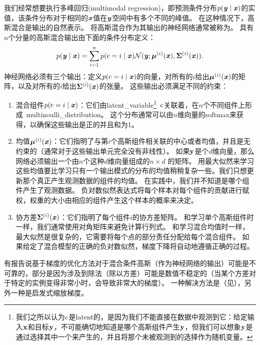 
我们经常想要执行多峰回归(multimodal regression)，即预测条件分布$p(\boldsymbol{\mathit{y}}\mid\boldsymbol{\mathit{x}})$的实值，该条件分布对于相同的$\boldsymbol{\mathit{x}}$值在$\boldsymbol{\mathit{y}}$空间中有多个不同的峰值。
在这种情况下，高斯混合是输出的自然表示\citep{Jacobs-nc91,bishop1994mixture}。
将高斯混合作为其输出的神经网络通常被称为。
具有$n$个分量的高斯混合输出由下面的条件分布定义：
\begin{equation}
p(\boldsymbol{\mathit{y}}\mid\boldsymbol{\mathit{x}}) = \sum_{i=1}^n p(\mathrm{c} = i \mid \boldsymbol{\mathit{x}}) \mathcal{N}(\boldsymbol{\mathit{y}}; \boldsymbol{\mu}^{(i)}(\boldsymbol{\mathit{x}}), \boldsymbol{\Sigma}^{(i)}(\boldsymbol{\mathit{x}})).
\end{equation}
神经网络必须有三个输出：定义$p(\mathrm{c}=i\mid\boldsymbol{\mathit{x}})$的向量，对所有的$i$给出$\boldsymbol{\mu}^{(i)}(\boldsymbol{\mathit{x}})$的矩阵，以及对所有的$i$给出$\boldsymbol{\Sigma}^{(i)}(\boldsymbol{\mathit{x}})$的张量。
这些输出必须满足不同的约束：
\begin{enumerate}
\item 混合组件$p(\mathrm{c}=i\mid\boldsymbol{\mathit{x}})$：它们由\gls{latent_variable}\footnote{我们之所以认为$\mathrm{c}$是\gls{latent}的，是因为我们不能直接在数据中观测到它：给定输入$\mathbf{x}$和目标$\mathbf{y}$，不可能确切地知道是哪个高斯组件产生$\mathbf{y}$，但我们可以想象$\mathbf{y}$是通过选择其中一个来产生的，并且将那个未被观测到的选择作为随机变量。}~$\mathrm{c}$关联着，在$n$个不同组件上形成~\gls{multinoulli_distribution}。
这个分布通常可以由$n$维向量的softmax来获得，以确保这些输出是正的并且和为1。

\item 均值$\boldsymbol{\mu}^{(i)}(\boldsymbol{\mathit{x}})$：它们指明了与第$i$个高斯组件相关联的中心或者均值，并且是无约束的（通常对于这些输出单元完全没有非线性）。
如果$\mathbf{y}$是个$d$维向量，那么网络必须输出一个由$n$个这种$d$维向量组成的$n\times d$ 的矩阵。
用最大似然来学习这些均值要比学习只有一个输出模式的分布的均值稍稍复杂一些。我们只想更新那个真正产生观测数据的组件的均值。
在实践中，我们并不知道是哪个组件产生了观测数据。
负对数似然表达式将每个样本对每个组件的贡献进行赋权，权重的大小由相应的组件产生这个样本的概率来决定。

\item 协方差$\boldsymbol{\Sigma}^{(i)}(\boldsymbol{\mathit{x}})$：它们指明了每个组件$i$的协方差矩阵。
和学习单个高斯组件时一样，我们通常使用对角矩阵来避免计算行列式。
和学习混合均值时一样，最大似然是很复杂的，它需要将每个点的部分责任分配给每个混合组件。
如果给定了混合模型的正确的负对数似然，梯度下降将自动地遵循正确的过程。
\end{enumerate}
有报告说基于梯度的优化方法对于混合条件高斯（作为神经网络的输出）可能是不可靠的，部分是因为涉及到除法（除以方差）可能是数值不稳定的（当某个方差对于特定的实例变得非常小时，会导致非常大的梯度）。
一种解决方法是（见），另外一种是启发式缩放梯度\citep{Uria+al-ICML2014}。

